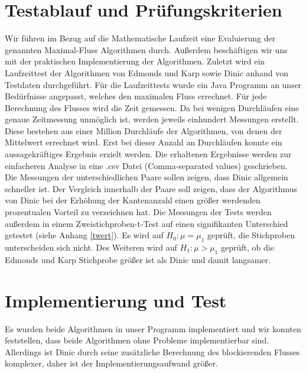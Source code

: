 \documentclass[a4paper]{llncs}
\begin{document}
\section{Testablauf und Prüfungskriterien}
\label{Inhalt}
Wir führen im Bezug auf die Mathematische Laufzeit eine Evaluierung der genannten Maximal-Fluss Algorithmen durch. Außerdem beschäftigen wir uns mit der praktischen Implementierung der Algorithmen. Zuletzt wird ein Laufzeit\-test der Algorithmen von Edmonds und Karp sowie Dinic anhand von Testdaten durchgeführt.
Für die Laufzeittests wurde ein Java Programm an unser Bedürfnisse angepasst, welches den maximalen Fluss errechnet. 
Für jede Berechnung des Flusses wird die Zeit gemessen. Da bei wenigen Durchläufen eine genaue Zeitmessung unmöglich ist, werden jeweils einhundert Messungen erstellt. Diese bestehen aus einer Million Durchläufe der Algorithmen, von denen der Mittelwert errechnet wird.
Erst bei dieser Anzahl an Durchläufen konnte ein aussagekräftiges Ergebnis erzielt werden.
Die erhaltenen Ergebnisse werden zur einfacheren Analyse in eine .csv Datei (Comma-separated values) geschrieben.
Die Messungen der unterschiedlichen Paare sollen zeigen, dass Dinic allgemein schneller ist.
Der Vergleich innerhalb der Paare soll zeigen, dass der Algorithmus von Dinic bei der Erhöhung der Kantenanzahl einen größer werdenden prozentualen Vorteil zu verzeichnen hat.
Die Messungen der Tests werden außerdem in einem Zweistichproben-t-Test auf einen signifikanten Unterschied getestet (siehe Anhang \ref{twert}).
Es wird auf $H_{0} : \mu =\mu_{1}$ geprüft, die Stichproben unterscheiden sich nicht.
Des Weiteren wird auf $H_{1} : \mu > \mu_{1}$ geprüft, ob die Edmonds und Karp Stichprobe größer ist als Dinic und damit langsamer.
\section{Implementierung und Test}
\label{Experimente}
Es wurden beide Algorithmen in unser Programm implementiert und wir konn\-ten feststellen, dass beide Algorithmen ohne Probleme implementierbar sind. Allerdings ist Dinic durch seine zusätzliche Berechnung des blockierenden Flusses komplexer, daher ist der Implementierungsaufwand größer.
\end{document}

